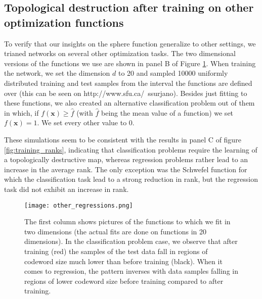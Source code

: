 \subsection{Topological destruction after training on other optimization functions}
To verify that our insights on the sphere function generalize to other settings, we trianed networks on several other optimization tasks. The two dimensional versions of the functions we use are shown in panel B of Figure \ref{fig:other regressions}. When training the network, we set the dimension $d$ to 20 and sampled 10000 uniformly distributed training and test samples from the interval the functions are defined over (this can be seen on http://www.sfu.ca/~ssurjano). Besides just fitting to these functions, we also created an alternative classification problem out of them in which, if $f(\textbf{x})\geq\hat{f}$ (with $\hat{f}$ being the mean value of a function) we set $f(\textbf{x})=1$. We set every other value to 0. 

These simulations seem to be consistent with the results in panel C of figure \ref{fig:training_ranks}, indicating that classification problems require the learning of a topologically destructive map, whereas regression problems rather lead to an increase in the average rank. The only exception was the Schwefel function for which the classification task lead to a strong reduction in rank, but the regression task did not exhibit an increase in rank.


\begin{figure}
    \centering
    \texttt{[image: other\_regressions.png]}
    \caption{The first column shows pictures of the functions to which we fit in two dimensions (the actual fits are done on functions in 20 dimensions). In the classification problem case, we observe that after training (red) the samples of the test data fall in regions of codeword size much lower than before training (black). When it comes to regression, the pattern inverses with data samples falling in regions of lower codeword size before training compared to after training.}
    \label{fig:other regressions}
\end{figure}

